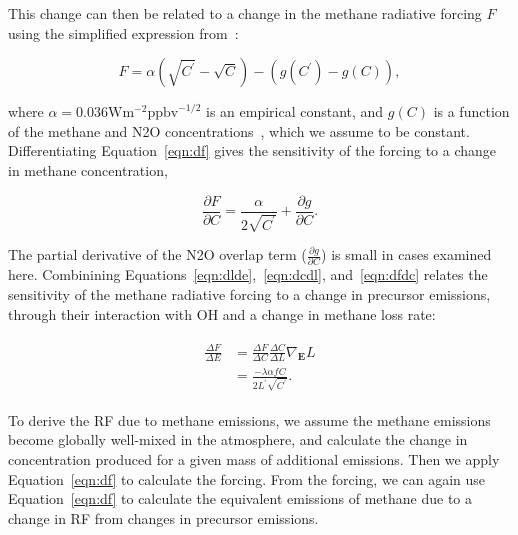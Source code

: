 This change can then be related to a change in the methane radiative forcing $F$ using the simplified expression from~\citet{ref:myhre1998}:

\begin{equation}
F = \alpha (\sqrt{C^{\prime}} - \sqrt{C}) - (g(C^{\prime}) - g(C)),
\label{eqn:df}
\end{equation}

where $\alpha=0.036 \mathrm{W}\mathrm{m}^{-2}\mathrm{ppbv}^{-1/2}$ is an empirical constant, and $g(C)$ is a function of the methane and N2O concentrations~\citep{ref:myhre1998}, which we assume to be constant. Differentiating Equation~\ref{eqn:df} gives the sensitivity of the forcing to a change in methane concentration,

\begin{equation}
\frac{\partial F}{\partial C} = \frac{\alpha}{2\sqrt{C^{\prime}}} + \frac{\partial g}{\partial C}.
\label{eqn:dfdc}
\end{equation}

The partial derivative of the N2O overlap term ($\frac{\partial g}{\partial C}$) is small in cases examined here. Combinining Equations~\ref{eqn:dlde},~\ref{eqn:dcdl}, and~\ref{eqn:dfdc} relates the sensitivity of the methane radiative forcing to a change in precursor emissions, through their interaction with OH and a change in methane loss rate:

\begin{equation}
\begin{align}
\begin{split}
\frac{\Delta F}{\Delta E} &= \frac{\Delta F}{\Delta C} \frac{\Delta C}{\Delta L} \nabla_{\mathbf{E}} L \\
                          &= \frac{-\lambda \alpha f C}{2L^{\prime}\sqrt{C^{\prime}}}.
\end{split}
\label{eqn:dfde}
\end{align}
\end{equation}

To derive the RF due to methane emissions, we assume the methane emissions become globally well-mixed in the atmosphere, and calculate the change in concentration produced for a given mass of additional emissions. Then we apply Equation~\ref{eqn:df} to calculate the forcing. From the forcing, we can again use Equation~\ref{eqn:df} to calculate the equivalent emissions of methane due to a change in RF from changes in precursor emissions.

